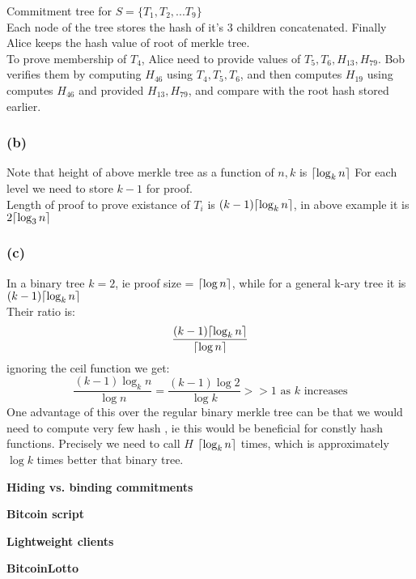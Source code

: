\documentclass[a4paper]{article}
\DeclarePairedDelimiter{\ceil}{\lceil}{\rceil}
\begin{document}
Commitment tree for $S=\{ T_1, T_2, ...T_9\}$ \\
Each node of the tree stores the hash of it's $3$ children concatenated. Finally Alice keeps the hash value of
root of merkle tree. \\
To prove membership of $T_4$, Alice need to provide values of $T_5,T_6, H_{13}, H_{79}$. Bob verifies them
by computing $H_{46}$ using $T_4, T_5, T_6$, and then computes $H_{19}$ using computes $H_{46}$ and provided
$H_{13}, H_{79}$, and compare with the root hash stored earlier.

\subsubsection*{(b)}
Note that height of above merkle tree as a function of $n, k$ is $\ceil{\log_k n}$
For each level we need to store $k-1$ for proof.\\
Length of proof to prove existance of $T_i$ is $(k-1)\ceil{\log_k n}$, in above example it is $2\ceil{\log_3 n}$

\subsubsection*{(c)}
In a binary tree $k = 2$, ie proof size = $\ceil{\log n}$, while for a general k-ary tree it is $(k-1)\ceil{\log_k n}$ \\

Their ratio is:
$$\dfrac{(k-1)\ceil{\log_k n}}{\ceil{\log n}}$$
ignoring the ceil function we get:
$$\dfrac{(k-1)\log_k n}{\log n} =  \dfrac{(k-1)\log 2}{\log k} >> 1 \text{ as $k$ increases}$$
One advantage of this over the regular binary merkle tree can be that we would need to compute very few hash
, ie this would be beneficial for constly hash functions.
Precisely we need to call $H$ $\ceil{\log_k n}$ times, which is approximately $\log k$ times better
that binary tree.

\begin{question}
    \textbf{Hiding vs. binding commitments}
\end{question}
\begin{question}
    \textbf{Bitcoin script}
\end{question}
\begin{question}
    \textbf{Lightweight clients}
\end{question}
\begin{question}
    \textbf{BitcoinLotto}
\end{question}
\end{document}
